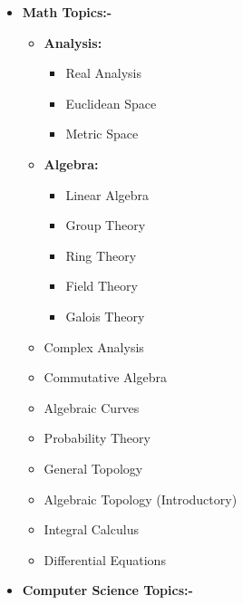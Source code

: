 \documentclass[10pt,a4paper,sans,colorlinks]{moderncv}        %
\begin{document}
\begin{itemize}
	\item 	\textbf{Math Topics:-}
	      \begin{itemize}
\item \textbf{Analysis:}
		      \begin{multicols}{3}
			       \begin{itemize}
				      \item Real Analysis
				      \item Euclidean Space
				      \item Metric Space
			      \end{itemize}
		      \end{multicols}
			      \item \textbf{Algebra:}\begin{multicols}{3}
			     	 \begin{itemize}
			     		\item Linear Algebra
			     		\item Group Theory
			     		\item Ring Theory
			     		\item Field Theory
			     		\item Galois Theory
			     		
			     	\end{itemize}
			     \end{multicols}
			      \end{itemize}
			      
			      \begin{multicols}{2}
			      	\begin{itemize}
			      \item Complex Analysis
			     \item Commutative Algebra
			     \item Algebraic Curves
			      \item Probability Theory
			     
			      \item General Topology
			      \item Algebraic Topology (Introductory)
			      \item Integral Calculus
			      \item Differential Equations
	      \end{itemize}
			      \end{multicols}
      \pagebreak
	\item \textbf{Computer Science Topics:-}
	      \begin{itemize}


\end{itemize}
\end{itemize}
\end{document}
